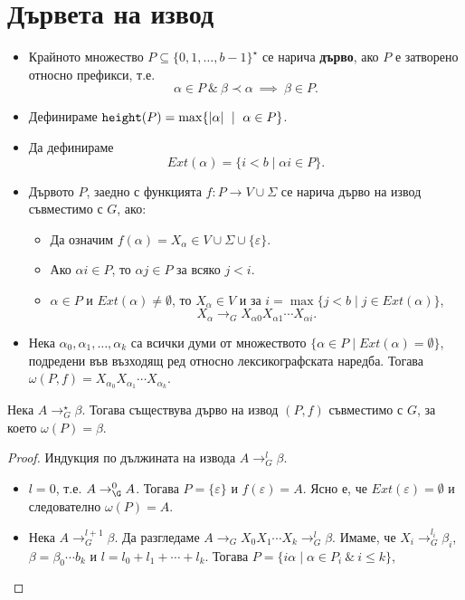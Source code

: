 \section{Дървета на извод}



\begin{itemize}
\item
  Крайното множество $P \subseteq \{0,1,\dots,b-1\}^\star$ се нарича {\bf дърво},
  ако $P$ е затворено относно префикси, т.е.
  \[\alpha \in P\ \&\ \beta \prec \alpha\ \implies\ \beta \in P.\]
\item
  Дефинираме $\texttt{height}(P) = \max\{\vert{\alpha}\vert\ \mid\ \alpha \in P\}$.
\item
  Да дефинираме
  \[Ext(\alpha) = \{ i < b \mid \alpha i \in P\}.\]
\item
  Дървото $P$, заедно с функцията $f:P \to V \cup \Sigma$ се нарича дърво на извод съвместимо с $G$, ако:
  \begin{itemize}
  \item
    Да означим $f(\alpha) = X_\alpha \in V \cup \Sigma \cup \{\varepsilon\}$.
  \item
    Ако $\alpha i \in P$, то $\alpha j \in P$ за всяко $j < i$.
  \item
    $\alpha \in P$ и $Ext(\alpha) \neq \emptyset$, то $X_\alpha \in V$ и за $i = \max\{ j < b\mid j \in Ext(\alpha)\}$,
    \[X_\alpha \to_G X_{\alpha 0} X_{\alpha 1} \cdots X_{\alpha i}.\] 
  \end{itemize}
\item
  Нека $\alpha_0, \alpha_1,\dots,\alpha_k$ са всички думи от множеството $\{\alpha \in P \mid Ext(\alpha) = \emptyset\}$,
  подредени във възходящ ред относно лексикографската наредба. Тогава 
  $\omega(P,f) = X_{\alpha_0} X_{\alpha_1}\cdots X_{\alpha_k}$.
\end{itemize}

\begin{lemma}
  Нека $A \to^\star_G \beta$. Тогава съществува дърво на извод $(P,f)$ съвместимо с $G$,
  за което $\omega(P) = \beta$.
\end{lemma}
\begin{proof}
  Индукция по дължината на извода $A \to^l_G \beta$.
  \begin{itemize}
  \item
    $l = 0$, т.е. $A \to^0_\G A$.
    Тогава $P = \{\varepsilon\}$ и $f(\varepsilon) = A$.
    Ясно е, че $Ext(\varepsilon) = \emptyset$ и следователно $\omega(P) = A$.
  \item
    Нека $A \to^{l+1}_G \beta$.
    Да разгледаме $A \to_G X_0X_1\cdots X_k \to^l_G \beta$.
    Имаме, че $X_i \to^{l_i}_G \beta_i$, $\beta = \beta_0\cdots b_k$ и $l = l_0+l_1+\cdots + l_k$.
    Тогава $P = \{ i\alpha \mid \alpha \in P_i\ \&\ i \leq k\}$,
    
  \end{itemize}
\end{proof}

